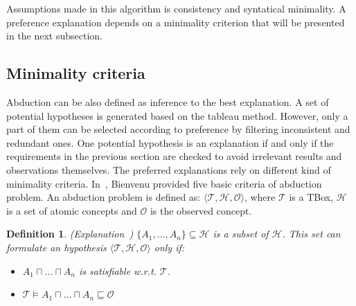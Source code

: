 \documentclass{article}
\newtheorem{mydef}{Definition}
\begin{document}
Assumptions made in this algorithm is consistency and syntatical minimality. 
A preference explanation depends on a minimality criterion that will be presented in the next subsection.


\subsection{Minimality criteria}
Abduction can be also defined as inference to the best explanation.
A set of potential hypotheses is generated based on the tableau method. However, only a part of them can be selected according to preference by filtering inconsistent and redundant ones. 
One potential hypothesis is an explanation if and only if the requirements in the previous section are checked to avoid irrelevant results and observations themselves.
The preferred explanations  rely on different kind of minimality criteria. 
In~\cite{bienvenu08complexity}, Bienvenu provided five basic criteria of abduction problem.
An abduction problem is defined as: $ \langle \mathcal{T}, \mathcal{H}, \mathcal{O}\rangle$, where $\mathcal{T}$ is a TBox, $\mathcal{H}$ is a set of atomic concepts and $\mathcal{O}$ is the observed concept.

\begin{mydef}{(Explanation~\cite{bienvenu08complexity})}
$\{ A_1,\dots,A_n \} \subseteq \mathcal{H}$ is a subset of $\mathcal{H}$. This set can formulate an hypothesis $ \langle \mathcal{T}, \mathcal{H}, \mathcal{O}\rangle$ only if:
\begin{itemize}
\item  $A_1 \sqcap \dots \sqcap A_n$ is satisfiable w.r.t. $\mathcal{T}$.
\item $\mathcal{T}  \vDash  A_1 \sqcap \dots \sqcap A_n \sqsubseteq \mathcal{O}$
\end{itemize}

\end{mydef}
\end{document}
